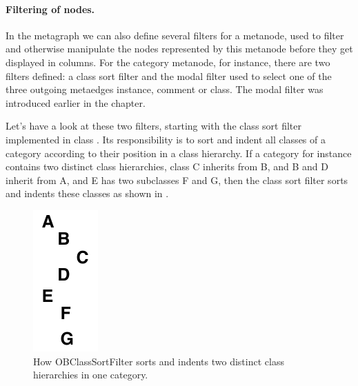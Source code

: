 \documentclass[a4paper,10pt,twoside]{book}
\begin{document}

\paragraph{Filtering of nodes.}

In the metagraph we can also define several filters for a metanode, used to filter and otherwise manipulate the nodes represented by this metanode before they get displayed in columns. For the category metanode, for instance, there are two filters defined: a class sort filter and the modal filter used to select one of the three outgoing metaedges instance, comment or class. The modal filter was introduced earlier in the chapter.

Let's have a look at these two filters, starting with the class sort filter implemented in class . Its responsibility is to sort and indent all classes of a category according to their position in a class hierarchy. If a category for instance contains two distinct class hierarchies, \eg class C inherits from B, and B and D inherit from A, and E has two subclasses F and G, then the class sort filter sorts and indents these classes as shown in .

\begin{figure}[!ht]
\begin{center}
\includegraphics[scale=1]{classSortFilter}
\caption{How OBClassSortFilter sorts and indents two distinct class hierarchies in one category.} 
\end{center}
\end{figure}
\end{document}

